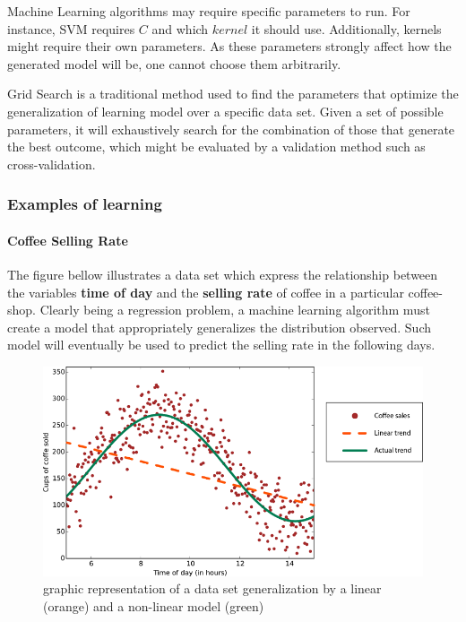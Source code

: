 \documentclass[12pt]{article}
\begin{document}
Machine Learning algorithms may require specific parameters to run. For instance, SVM requires $C$ and which $kernel$ it should use. Additionally, kernels might require their own parameters. As these parameters strongly affect how the generated model will be, one cannot choose them arbitrarily.

Grid Search is a traditional method used to find the parameters that optimize the generalization of learning model over a specific data set. \cite{gridsearch} Given a set of possible parameters, it will exhaustively search for the combination of those that generate the best outcome, which might be evaluated by a validation method such as cross-validation.

\subsubsection{Examples of learning}

\paragraph{Coffee Selling Rate}

The figure bellow illustrates a data set which express the relationship between the variables \textbf{time of day} and the \textbf{selling rate} of coffee in a particular coffee-shop. Clearly being a regression problem, a machine learning algorithm must create a model that appropriately generalizes the distribution observed. Such model will eventually be used to predict the selling rate in the following days.

\begin{figure}[H]
	\centering
	\captionsetup{justification=centering}

	\includegraphics[scale=.6]{rohrer2015}
	\caption{graphic representation of a data set generalization by a linear (orange) and a non-linear model (green)}
	\label{fig:rohrer2015}
\end{figure}
\end{document}
